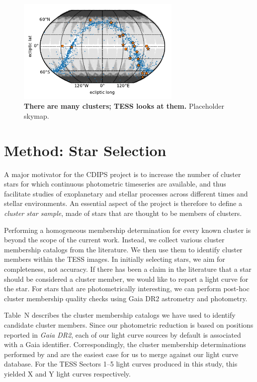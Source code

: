 \documentclass[12pt,twocolumn,tighten]{aastex62}
\begin{document}
\begin{figure}[t]
	\begin{center}
		\leavevmode
		\includegraphics[width=0.7\textwidth]{cluster_positions.pdf}
	\end{center}
	\vspace{-0.5cm}
	\caption{
    {\bf There are many clusters; TESS looks at them.} Placeholder skymap.
		\label{fig:clustermap}
	}
\end{figure}


\section{Method: Star Selection}
\label{sec:starselection}

A major motivator for the CDIPS project is to increase the number of
cluster stars for which continuous photometric timeseries are
available, and thus facilitate studies of exoplanetary and stellar
processes across different times and stellar environments.
An essential aspect of the project is therefore to define a {\it
cluster star sample}, made of stars that are thought to be
members of clusters.

Performing a homogeneous membership determination for every known
cluster is beyond the scope of the current work.  Instead, we collect
various cluster membership catalogs from the literature.  We then use
them to identify cluster members within the TESS images.  In initially
selecting stars, we aim for completeness, not accuracy.  If there has
been a claim in the literature that a star should be considered a
cluster member, we would like to report a light curve for the star.
For stars that are photometrically interesting, we can perform post-hoc
cluster membership quality checks using Gaia DR2 astrometry and photometry.

Table~N describes the cluster membership catalogs we have used to
identify candidate cluster members.  Since our photometric reduction
is based on positions reported in {\it Gaia DR2}, each of our
light curve sources by default is associated with a Gaia identifier.
Correspondingly, the cluster membership determinations performed by
\citet{cantat-gaudin_gaia_2018} and \citet{gaia_hr_2018} are the
easiest case for us to merge against our light curve database.
For the TESS Sectors 1--5 light curves produced in this study, this
yielded X and Y light curves respectively.
\end{document}
